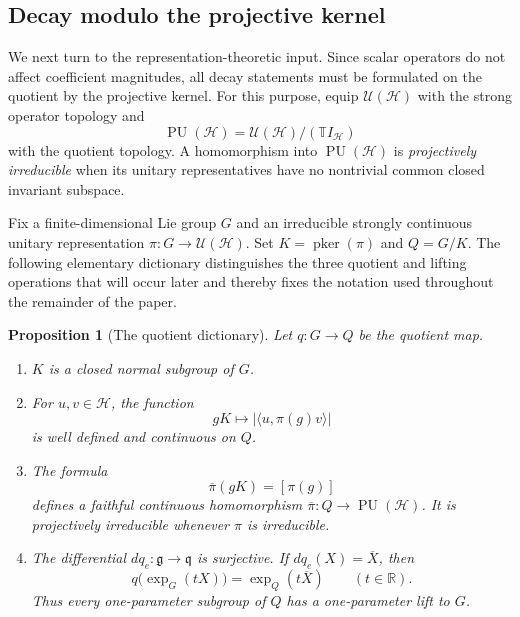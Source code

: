 \documentclass[reqno]{amsart}
\numberwithin{equation}{section}
\newtheorem{proposition}[theorem]{Proposition}
\theoremstyle{definition}
\theoremstyle{remark}
\newcommand{\cH}{\mathcal H}
\newcommand{\R}{\mathbb R}
\newcommand{\T}{\mathbb T}
\newcommand{\U}{\mathcal U}
\newcommand{\PU}{\operatorname{PU}}
\newcommand{\pker}{\operatorname{pker}}
\begin{document}
\subsection{Decay modulo the projective kernel}

We next turn to the representation-theoretic input.  Since scalar operators
do not affect coefficient magnitudes, all decay statements must be
formulated on the quotient by the projective kernel.  For this purpose,
equip $\U(\cH)$ with the strong operator topology and
\[
 \PU(\cH)=\U(\cH)/(\T I_{\cH})
\]
with the quotient topology.  A homomorphism into $\PU(\cH)$ is
\emph{projectively irreducible} when its unitary representatives have no
nontrivial common closed invariant subspace.

Fix a finite-dimensional Lie group $G$ and an irreducible strongly continuous
unitary representation $\pi:G\to\U(\cH)$.  Set $K=\pker(\pi)$ and
$Q=G/K$.  The following elementary dictionary distinguishes the three
quotient and lifting operations that will occur later and thereby fixes the
notation used throughout the remainder of the paper.

\begin{proposition}[The quotient dictionary]
\label{prop:quotient-dictionary}
Let $q:G\to Q$ be the quotient map.
\begin{enumerate}[label=\textnormal{(\roman*)}]
\item $K$ is a closed normal subgroup of $G$.
\item For $u,v\in\cH$, the function
\[
 gK\longmapsto |\langle u,\pi(g)v\rangle|
\]
is well defined and continuous on $Q$.
\item The formula
\[
 \overline\pi(gK)=[\pi(g)]
\]
defines a faithful continuous homomorphism
$\overline\pi:Q\to\PU(\cH)$.  It is projectively irreducible whenever
$\pi$ is irreducible.
\item The differential $dq_e:\mathfrak g\to\mathfrak q$ is surjective.  If
$dq_e(X)=\overline X$, then
\begin{equation}\label{eq:quotient-exp-intertwining}
 q\bigl(\exp_G(tX)\bigr)=\exp_Q(t\overline X)
 \qquad(t\in\R).
\end{equation}
Thus every one-parameter subgroup of $Q$ has a one-parameter lift to $G$.
\end{enumerate}
\end{proposition}
\end{document}
